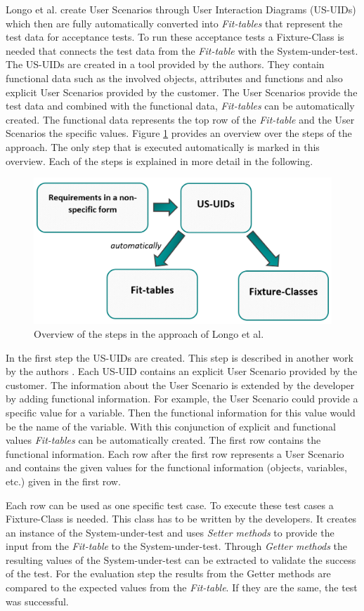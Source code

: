 Longo et al. \cite{longo} create User Scenarios through User Interaction Diagrams (US-UIDs) which then are fully automatically converted into \textit{Fit-tables} that represent the test data for acceptance tests.
To run these acceptance tests a Fixture-Class is needed that connects the test data from the \textit{Fit-table} with the System-under-test.
The US-UIDs are created in a tool provided by the authors.
They contain functional data such as the involved objects, attributes and functions and also explicit User Scenarios provided by the customer.
The User Scenarios provide the test data and combined with the functional data, \textit{Fit-tables} can be automatically created.
The functional data represents the top row of the \textit{Fit-table} and the User Scenarios the specific values.
Figure \ref{fig:overview-longo} provides an overview over the steps of the approach.
The only step that is executed automatically is marked in this overview.
Each of the steps is explained in more detail in the following.

\begin{figure}[H]
	\centering
	\includegraphics[width=.62\textwidth]{../images/LongoProcess.png}
	\caption{Overview of the steps in the approach of Longo et al.}
	\label{fig:overview-longo}
\end{figure}
\newpage
In the first step the US-UIDs are created.
This step is described in another work by the authors \cite{longo2}.
Each US-UID contains an explicit User Scenario provided by the customer.
The information about the User Scenario is extended by the developer by adding functional information.
For example, the User Scenario could provide a specific value for a variable.
Then the functional information for this value would be the name of the variable.
With this conjunction of explicit and functional values \textit{Fit-tables} can be automatically created.
The first row contains the functional information.
Each row after the first row represents a User Scenario and contains the given values for the functional information (objects, variables, etc.) given in the first row.

Each row can be used as one specific test case.
To execute these test cases a Fixture-Class is needed.
This class has to be written by the developers.
It creates an instance of the System-under-test and uses \textit{Setter methods} to provide the input from the \textit{Fit-table} to the System-under-test.
Through \textit{Getter methods} the resulting values of the System-under-test can be extracted to validate the success of the test.
For the evaluation step the results from the Getter methods are compared to the expected values from the \textit{Fit-table}.
If they are the same, the test was successful.

